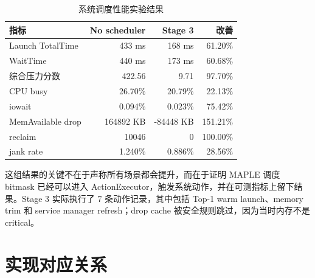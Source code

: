 \begin{table}[htbp]
\centering
\caption{系统调度性能实验结果}
\label{tab:scheduler}
\begin{tabular}{lrrr}
\toprule
指标 & No scheduler & Stage 3 & 改善 \\
\midrule
Launch TotalTime & 433 ms & 168 ms & 61.20\% \\
WaitTime & 440 ms & 173 ms & 60.68\% \\
综合压力分数 & 422.56 & 9.71 & 97.70\% \\
CPU busy & 26.70\% & 20.79\% & 22.13\% \\
iowait & 0.094\% & 0.023\% & 75.42\% \\
MemAvailable drop & 164892 KB & -84448 KB & 151.21\% \\
reclaim & 10046 & 0 & 100.00\% \\
jank rate & 1.240\% & 0.886\% & 28.56\% \\
\bottomrule
\end{tabular}
\end{table}

这组结果的关键不在于声称所有场景都会提升，而在于证明 MAPLE 调度 bitmask 已经可以进入 ActionExecutor，触发系统动作，并在可测指标上留下结果。Stage 3 实际执行了 7 条动作记录，其中包括 Top-1 warm launch、memory trim 和 service manager refresh；drop cache 被安全规则跳过，因为当时内存不是 critical。

\section{实现对应关系}

